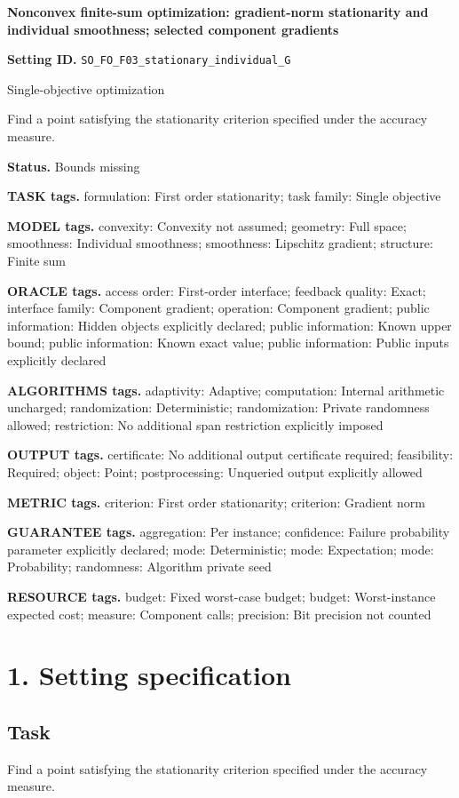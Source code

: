 \documentclass[10pt,a4paper]{article}
\begin{document}
\raggedright

{\LARGE\bfseries\sffamily\color{AtlasNavy} Nonconvex finite-sum optimization: gradient-norm stationarity and individual smoothness; selected component gradients\par}\vspace{5pt}
\textbf{Setting ID.} \texttt{SO\_\allowbreak{}FO\_\allowbreak{}F03\_\allowbreak{}stationary\_\allowbreak{}individual\_\allowbreak{}G}

Single-objective optimization

Find a point satisfying the stationarity criterion specified under the accuracy measure.

\textbf{Status.} Bounds missing

\textbf{TASK tags.} formulation: First order stationarity; task family: Single objective

\textbf{MODEL tags.} convexity: Convexity not assumed; geometry: Full space; smoothness: Individual smoothness; smoothness: Lipschitz gradient; structure: Finite sum

\textbf{ORACLE tags.} access order: First-order interface; feedback quality: Exact; interface family: Component gradient; operation: Component gradient; public information: Hidden objects explicitly declared; public information: Known upper bound; public information: Known exact value; public information: Public inputs explicitly declared

\textbf{ALGORITHMS tags.} adaptivity: Adaptive; computation: Internal arithmetic uncharged; randomization: Deterministic; randomization: Private randomness allowed; restriction: No additional span restriction explicitly imposed

\textbf{OUTPUT tags.} certificate: No additional output certificate required; feasibility: Required; object: Point; postprocessing: Unqueried output explicitly allowed

\textbf{METRIC tags.} criterion: First order stationarity; criterion: Gradient norm

\textbf{GUARANTEE tags.} aggregation: Per instance; confidence: Failure probability parameter explicitly declared; mode: Deterministic; mode: Expectation; mode: Probability; randomness: Algorithm private seed

\textbf{RESOURCE tags.} budget: Fixed worst-case budget; budget: Worst-instance expected cost; measure: Component calls; precision: Bit precision not counted

\section{1. Setting specification}
\subsection{Task}
Find a point satisfying the stationarity criterion specified under the accuracy measure.
\end{document}
